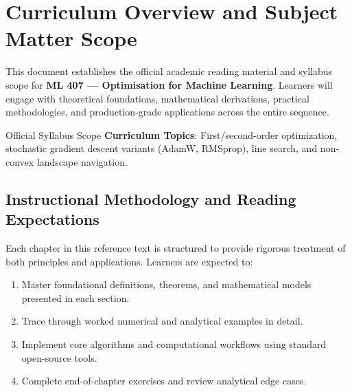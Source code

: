 \section{Curriculum Overview and Subject Matter Scope}

This document establishes the official academic reading material and syllabus scope for \textbf{ML 407 --- Optimisation for Machine Learning}. Learners will engage with theoretical foundations, mathematical derivations, practical methodologies, and production-grade applications across the entire sequence.

\begin{InsightBox}{Official Syllabus Scope}
  \textbf{Curriculum Topics}: First/second-order optimization, stochastic gradient descent variants (AdamW, RMSprop), line search, and non-convex landscape navigation.
\end{InsightBox}

\subsection{Instructional Methodology and Reading Expectations}

Each chapter in this reference text is structured to provide rigorous treatment of both principles and applications. Learners are expected to:
\begin{enumerate}
  \item Master foundational definitions, theorems, and mathematical models presented in each section.
  \item Trace through worked numerical and analytical examples in detail.
  \item Implement core algorithms and computational workflows using standard open-source tools.
  \item Complete end-of-chapter exercises and review analytical edge cases.
\end{enumerate}

